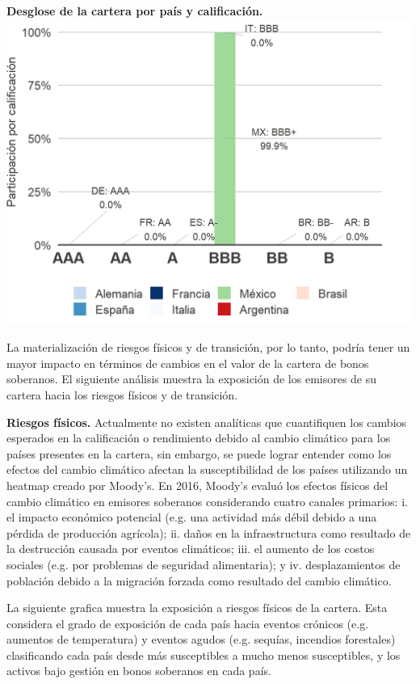 \documentclass[10pt,table]{article}\usepackage[]{graphicx}\usepackage[]{color}
\begin{document}
\begin{multicols}{2}
		\textbf{Desglose de la cartera por país y calificación.}\\
		\includegraphics[trim = {0, 0, 0, 0cm},width=1\linewidth]{ReportOutputs/Fig91}
		
	La materialización de riesgos físicos y de transición, por lo tanto, podría tener un mayor impacto en términos de cambios en el valor de la cartera de bonos soberanos. El siguiente análisis muestra la exposición de los emisores de su cartera hacia los riesgos físicos y de transición.
	 
		
		\textbf{Riesgos físicos.} Actualmente no existen analíticas que cuantifiquen los cambios esperados en la calificación o rendimiento debido al cambio climático para los países presentes en la cartera, sin embargo, se puede lograr entender como los efectos del cambio climático afectan la susceptibilidad de los países utilizando un heatmap creado por Moody’s. En 2016, Moody’s evaluó los efectos físicos del cambio climático en emisores soberanos considerando cuatro canales primarios: i. el impacto económico potencial (e.g. una actividad más débil debido a una pérdida de producción agrícola); ii. daños en la infraestructura como resultado de la destrucción causada por eventos climáticos; iii. el aumento de los costos sociales (e.g. por problemas de seguridad alimentaria); y iv. desplazamientos de población debido a la migración forzada como resultado del cambio climático.
			
	La siguiente grafica muestra la exposición a riesgos físicos de la cartera. Esta considera el grado de exposición de cada país hacia eventos crónicos (e.g. aumentos de temperatura) y eventos agudos (e.g. sequías, incendios forestales) clasificando cada país desde más susceptibles a mucho menos susceptibles, y los activos bajo gestión en bonos soberanos en cada país.
	 

\end{multicols}
\end{document}

